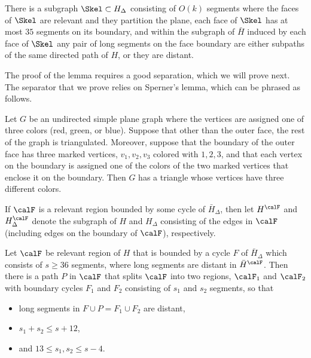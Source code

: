 \begin{lemma}\label{lem:slicedskeleton}
There is a subgraph $\Skel \subset H_\Delta$ consisting of $O(k)$ segments where the faces of $\Skel$ are relevant and they partition the plane, each face of $\Skel$ has at most $35$ segments on its boundary, and within the subgraph of $\bar{H}$ induced by each face of $\Skel$ any pair of long segments on the face boundary are either subpaths of the same directed path of $H$, or they are distant.
\end{lemma}

The proof of the lemma requires a good separation, which we will prove next. The separator that we prove relies on Sperner's lemma, which can be phrased as follows.

\begin{theorem}
Let $G$ be an undirected simple plane graph where the vertices are assigned one of three colors (red, green, or blue). Suppose that other than the outer face, the rest of the graph is triangulated. Moreover, suppose that the boundary of the outer face has three marked vertices, $v_1,v_2,v_3$ colored with $1,2,3$, and that each vertex on the boundary is assigned one of the colors of the two marked vertices that enclose it on the boundary. Then $G$ has a triangle whose vertices have three different colors.
\end{theorem}

If $\calF$ is a relevant region bounded by some cycle of $\bar{H}_\Delta$, then let $H^\calF$ and $H^\calF_\Delta$ denote the subgraph of $H$ and $H_\Delta$ consisting of the edges in $\calF$ (including edges on the boundary of $\calF$), respectively.

\begin{lemma}[Separator]\label{lem:sperner_sep}
Let $\calF$ be relevant region of $H$ that is bounded by a cycle $F$ of $\bar{H}_\Delta$ which consists of $s\geq 36$ segments, where long segments are distant in $\bar{H}^\calF$. Then there is a path $P$ in $\calF$ that splits $\calF$ into two regions, $\calF_1$ and $\calF_2$ with boundary cycles $F_1$ and $F_2$ consisting of $s_1$ and $s_2$ segments, so that
\begin{itemize}
\item long segments in $F\cup P=F_1\cup F_2$ are distant,
\item $s_1+s_2\leq s+12$,
\item and $13\leq  s_1,s_2 \leq s-4$.
\end{itemize} 
\end{lemma}

